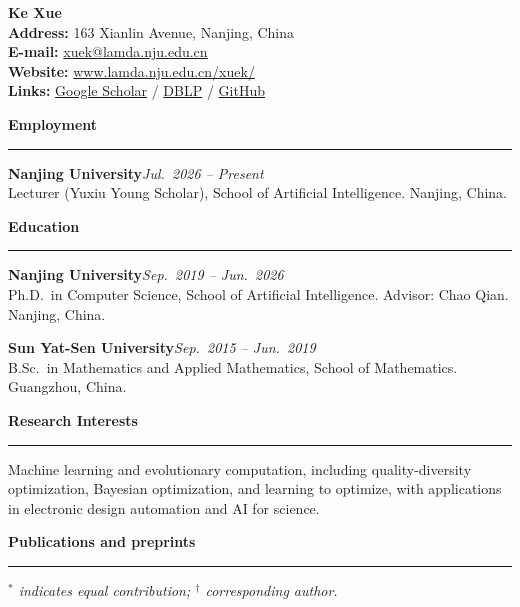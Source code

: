 \documentclass[10pt,a4paper]{article}
\newcommand{\cvname}[1]{{\Large\bfseries #1}}
\newcommand{\cvsection}[1]{%
  \vspace{0.65em}%
  \noindent\textbf{\large #1}\\[-0.15em]
  \rule{\textwidth}{0.4pt}%
  \vspace{0.4em}%
}
\newcommand{\cventry}[3]{%
  \noindent\textbf{#1}\hfill\textit{#2}\\[-0.05em]
  #3\par
}
\begin{document}
\pagestyle{empty}

\noindent
{\cvname{Ke Xue}}\\[0.4em]
\textbf{Address:} 163 Xianlin Avenue, Nanjing, China\\
\textbf{E-mail:} \href{mailto:xuek@lamda.nju.edu.cn}{xuek@lamda.nju.edu.cn}\\
\textbf{Website:} \href{https://www.lamda.nju.edu.cn/xuek/}{www.lamda.nju.edu.cn/xuek/}\\
\textbf{Links:}
\href{https://scholar.google.com/citations?user=78bZVOwAAAAJ}{Google Scholar} /
\href{https://dblp.org/pid/93/2469-1.html}{DBLP} /
\href{https://github.com/KeXue-NJU}{GitHub}

\cvsection{Employment}
\cventry{Nanjing University}{Jul.\ 2026 -- Present}{%
  Lecturer (Yuxiu Young Scholar), School of Artificial Intelligence. Nanjing, China.}

\cvsection{Education}
\cventry{Nanjing University}{Sep.\ 2019 -- Jun.\ 2026}{%
  Ph.D.\ in Computer Science, School of Artificial Intelligence. Advisor: Chao Qian. Nanjing, China.}
\cventry{Sun Yat-Sen University}{Sep.\ 2015 -- Jun.\ 2019}{%
  B.Sc.\ in Mathematics and Applied Mathematics, School of Mathematics. Guangzhou, China.}

\cvsection{Research Interests}
Machine learning and evolutionary computation, including quality-diversity optimization, Bayesian optimization, and learning to optimize, with applications in electronic design automation and AI for science.

\cvsection{Publications and preprints}

\textit{$^*$ indicates equal contribution; $^\dagger$ corresponding author.}
\end{document}
